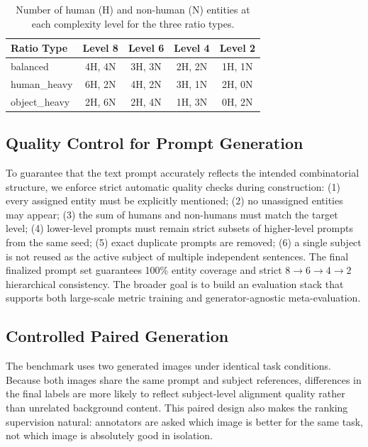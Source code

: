 \begin{table}[t]
\centering
\small
\caption{Number of human (H) and non-human (N) entities at each complexity level for the three ratio types.}
\label{tab:entity_ratio_levels}
\begin{tabular}{lcccc}
\toprule
\textbf{Ratio Type} & \textbf{Level 8} & \textbf{Level 6} & \textbf{Level 4} & \textbf{Level 2} \\
\midrule
balanced & 4H, 4N & 3H, 3N & 2H, 2N & 1H, 1N \\
human\_heavy & 6H, 2N & 4H, 2N & 3H, 1N & 2H, 0N \\
object\_heavy & 2H, 6N & 2H, 4N & 1H, 3N & 0H, 2N \\
\bottomrule
\end{tabular}
\end{table}

\subsection{Quality Control for Prompt Generation}
To guarantee that the text prompt accurately reflects the intended combinatorial structure, we enforce strict automatic quality checks during construction: (1) every assigned entity must be explicitly mentioned; (2) no unassigned entities may appear; (3) the sum of humans and non-humans must match the target level; (4) lower-level prompts must remain strict subsets of higher-level prompts from the same seed; (5) exact duplicate prompts are removed; (6) a single subject is not reused as the active subject of multiple independent sentences. The final finalized prompt set guarantees 100\% entity coverage and strict $8 \rightarrow 6 \rightarrow 4 \rightarrow 2$ hierarchical consistency. The broader goal is to build an evaluation stack that supports both large-scale metric training and generator-agnostic meta-evaluation.

\subsection{Controlled Paired Generation}
The benchmark uses two generated images under identical task conditions. Because both images share the same prompt and subject references, differences in the final labels are more likely to reflect subject-level alignment quality rather than unrelated background content. This paired design also makes the ranking supervision natural: annotators are asked which image is better for the same task, not which image is absolutely good in isolation.

